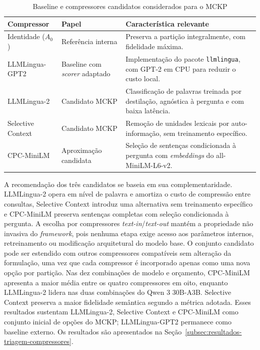 \begin{table}[htbp]
\centering
\caption{Baseline e compressores candidatos considerados para o MCKP}
\label{tab:compressores}
\begin{tabular}{>{\raggedright\arraybackslash}p{3.2cm}>{\raggedright\arraybackslash}p{2.5cm}>{\raggedright\arraybackslash}p{6.0cm}}
\toprule
\textbf{Compressor} & \textbf{Papel} & \textbf{Característica relevante} \\
\midrule
Identidade ($A_0$) & Referência interna & Preserva a partição integralmente, com fidelidade máxima. \\
\addlinespace
LLMLingua-GPT2 \cite{jiang2023llmlingua} & Baseline com \textit{scorer} adaptado & Implementação do pacote \texttt{llmlingua}, com GPT-2 em CPU para reduzir o custo local. \\
\addlinespace
LLMLingua-2 \cite{pan2024llmlingua2} & Candidato MCKP & Classificação de palavras treinada por destilação, agnóstica à pergunta e com baixa latência. \\
\addlinespace
Selective Context \cite{li2023selective} & Candidato MCKP & Remoção de unidades lexicais por auto-informação, sem treinamento específico. \\
\addlinespace
CPC-MiniLM \cite{li2024cpc} & Aproximação candidata & Seleção de sentenças condicionada à pergunta com \textit{embeddings} do all-MiniLM-L6-v2. \\
\bottomrule
\end{tabular}
\end{table}

A recomendação dos três candidatos se baseia em sua complementaridade. LLMLingua-2 opera em nível de palavra e amortiza o custo de compressão entre consultas, Selective Context introduz uma alternativa sem treinamento específico e CPC-MiniLM preserva sentenças completas com seleção condicionada à pergunta. A escolha por compressores \textit{text-in}/\textit{text-out} mantém a propriedade não invasiva do \textit{framework}, pois nenhuma etapa exige acesso aos parâmetros internos, retreinamento ou modificação arquitetural do modelo base. O conjunto candidato pode ser estendido com outros compressores compatíveis sem alteração da formulação, uma vez que cada compressor é incorporado apenas como uma nova opção por partição. Nas dez combinações de modelo e orçamento, CPC-MiniLM apresenta a maior média entre os quatro compressores em oito, enquanto LLMLingua-2 lidera nas duas combinações do Qwen 3 30B-A3B. Selective Context preserva a maior fidelidade semântica segundo a métrica adotada. Esses resultados sustentam LLMLingua-2, Selective Context e CPC-MiniLM como conjunto inicial de opções do MCKP; LLMLingua-GPT2 permanece como baseline externo. Os resultados são apresentados na Seção~\ref{subsec:resultados-triagem-compressores}.

